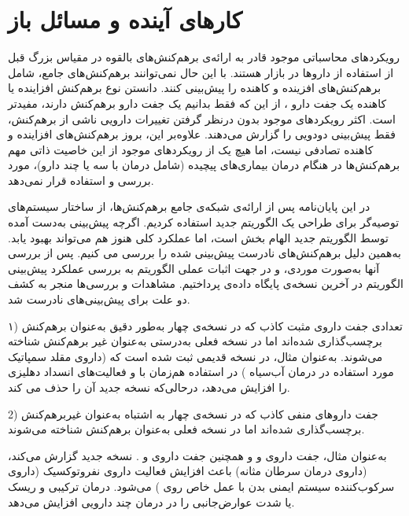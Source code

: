 \chapter{ کار‌های آینده و مسائل باز}
\label{chapter:conclusion}

رویکردهای محاسباتی موجود قادر به ارائه‌ی برهم‌کنش‌های بالقوه  در مقیاس بزرگ قبل از استفاده از داروها در بازار هستند. با این حال نمی‌توانند برهم‌کنش‌های جامع، شامل برهم‌کنش‌های افزینده و کاهنده را پیش‌بینی کنند. دانستن نوع برهم‌کنش افزاینده یا کاهنده یک جفت دارو ، از این که فقط بدانیم یک جفت دارو برهم‌کنش دارند، مفیدتر است. اکثر رویکردهای موجود بدون درنظر گرفتن تغییرات دارویی ناشی از برهم‌کنش، فقط پیش‌بینی دودویی را گزارش می‌دهند. علاوه‌بر این، بروز برهم‌کنش‌های افزاینده و کاهنده تصادفی نیست، اما هیچ یک از رویکردهای موجود از این خاصیت ذاتی مهم برهم‌کنش‌ها در هنگام درمان بیماری‌های پیچیده (شامل درمان با سه یا چند دارو)، مورد بررسی و استفاده قرار نمی‌دهد.

در این پایان‌نامه پس از ارائه‌ی شبکه‌ی جامع برهم‌کنش‌ها، از ساختار سیستم‌های توصیه‌گر برای طراحی یک الگوریتم جدید استفاده کردیم. اگرچه پیش‌بینی به‌دست آمده توسط الگوریتم جدید الهام بخش است، اما عملکرد کلی هنوز هم می‌تواند بهبود یابد. به‌همین دلیل برهم‌کنش‌های نادرست پیش‌بینی شده را بررسی می کنیم. پس از بررسی آنها به‌صورت موردی، و در جهت اثبات عملی الگوریتم به بررسی عملکرد پیش‌‌بینی الگوریتم در آخرین نسخه‌ی پایگاه داده‌ی 
 پرداختیم. مشاهدات و بررسی‌ها منجر به کشف دو علت برای پیش‌بینی‌های نادرست شد. 

۱) تعدادی جفت داروی مثبت کاذب که در نسخه‌ی چهار 
به‌طور دقیق به‌عنوان برهم‌کنش برچسب‌گذاری شده‌اند اما در نسخه فعلی به‌درستی به‌عنوان غیر برهم‌کنش شناخته می‌شوند. به‌عنوان مثال، در نسخه قدیمی
ثبت شده است که
(داروی مقلد سمپاتیک
 مورد استفاده در درمان آب‌سیاه
) در استفاده هم‌زمان با 
و
فعالیت‌های انسداد دهلیزی
را افزایش می‌دهد، درحالی‌که نسخه جدید آن را حذف می کند.

 
2) جفت داروهای منفی کاذب که در نسخه‌ی چهار
به‌ اشتباه به‌عنوان غیربرهم‌کنش برچسب‌گذاری شده‌اند اما در نسخه فعلی به‌عنوان برهم‌کنش شناخته می‌شوند.

به‌عنوان مثال، جفت داروی
و
و همچنین جفت داروی
و
.
 نسخه جدید
گزارش می‌کند، 
(داروی درمان سرطان مثانه) باعث افزایش فعالیت داروی نفروتوکسیک
(داروی سرکوب‌کننده سیستم ایمنی بدن با عمل خاص روی 
) می‌شود. درمان ترکیبی
و
ریسک یا شدت عوارض‌جانبی را در درمان چند دارویی افزایش می‌دهد. 

